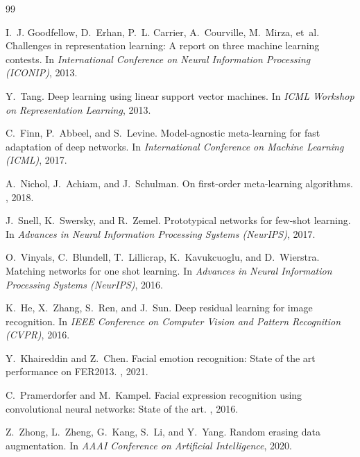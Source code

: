 \documentclass[11pt,a4paper]{article}
\begin{document}
\newpage
\begin{thebibliography}{99}
\small

I.~J. Goodfellow, D.~Erhan, P.~L. Carrier, A.~Courville, M.~Mirza, et~al.
\newblock Challenges in representation learning: A report on three machine
  learning contests.
\newblock In {\em International Conference on Neural Information Processing
  (ICONIP)}, 2013.

Y.~Tang.
\newblock Deep learning using linear support vector machines.
\newblock In {\em ICML Workshop on Representation Learning}, 2013.

C.~Finn, P.~Abbeel, and S.~Levine.
\newblock Model-agnostic meta-learning for fast adaptation of deep networks.
\newblock In {\em International Conference on Machine Learning (ICML)}, 2017.

A.~Nichol, J.~Achiam, and J.~Schulman.
\newblock On first-order meta-learning algorithms.
, 2018.

J.~Snell, K.~Swersky, and R.~Zemel.
\newblock Prototypical networks for few-shot learning.
\newblock In {\em Advances in Neural Information Processing Systems
  (NeurIPS)}, 2017.

O.~Vinyals, C.~Blundell, T.~Lillicrap, K.~Kavukcuoglu, and D.~Wierstra.
\newblock Matching networks for one shot learning.
\newblock In {\em Advances in Neural Information Processing Systems
  (NeurIPS)}, 2016.

K.~He, X.~Zhang, S.~Ren, and J.~Sun.
\newblock Deep residual learning for image recognition.
\newblock In {\em IEEE Conference on Computer Vision and Pattern Recognition
  (CVPR)}, 2016.

Y.~Khaireddin and Z.~Chen.
\newblock Facial emotion recognition: State of the art performance on FER2013.
, 2021.

C.~Pramerdorfer and M.~Kampel.
\newblock Facial expression recognition using convolutional neural networks:
  State of the art.
, 2016.

Z.~Zhong, L.~Zheng, G.~Kang, S.~Li, and Y.~Yang.
\newblock Random erasing data augmentation.
\newblock In {\em AAAI Conference on Artificial Intelligence}, 2020.

\end{thebibliography}
\end{document}
